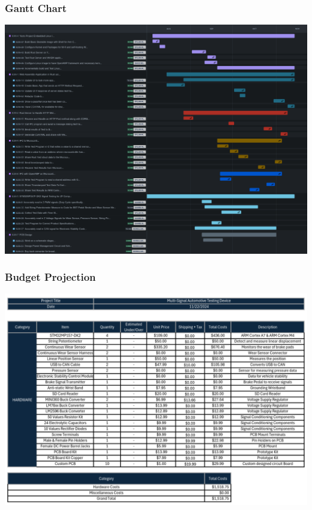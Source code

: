 \documentclass[8pt,compress,aspectratio=169]{beamer}
\begin{document}
\begin{frame}
  \frametitle{Gantt Chart}
  \centering
  \includegraphics[height=0.85\paperheight]{assets/diagrams/gantt.png}
\end{frame}

\begin{frame}
  \frametitle{Budget Projection}
  \centering
  \includegraphics[height=0.80\paperheight]{assets/diagrams/budget.png}
\end{frame}
\end{document}
